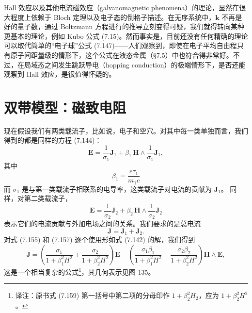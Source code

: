 Hall 效应以及其他电流磁效应（galvanomagnetic phenomena）的理论，显然在很大程度上依赖于 Bloch 定理以及电子态的倒格子描述。在无序系统中，$\mathbf{k}$ 不再是好的量子数，通过 Boltzmann 方程进行的推导立刻变得可疑，我们就得转向某种更基本的理论，例如 Kubo 公式 (7.15)。然而事实是，目前还没有任何精确的理论可以取代简单的“电子球”公式 (7.147)——人们观察到，即使在电子平均自由程只有原子间距量级的情形下，这个公式在液态金属（§7.5）中也符合得非常好。不过，在局域态之间发生跳跃导电（hopping conduction）的极端情形下，是否还能观察到 Hall 效应，是很值得怀疑的。

\section{双带模型：磁致电阻}

现在假设我们有两类载流子，比如说，电子和空穴。对其中每一类单独而言，我们得到的都是同样的方程 (7.144)：
\begin{equation*}
\mathbf{E}=\frac{1}{\sigma_{1}}\mathbf{J}_{1}+\beta_{1}\,\mathbf{H}\wedge\frac{1}{\sigma_{1}}\mathbf{J}_{1},\tag{7.155}
\end{equation*}
其中
\begin{equation*}
\beta_{1}=\frac{e\tau_{1}}{m_{1}c}\tag{7.156}
\end{equation*}
而 $\sigma_{1}$ 是与第一类载流子相联系的电导率，这类载流子对电流的贡献为 $\mathbf{J}_{1}$。
同样，对第二类载流子，
\begin{equation*}
\mathbf{E}=\frac{1}{\sigma_{2}}\mathbf{J}_{2}+\beta_{2}\,\mathbf{H}\wedge\frac{1}{\sigma_{2}}\mathbf{J}_{2}\tag{7.157}
\end{equation*}
表示它们的电流贡献与外加电场之间的关系。我们要求的是总电流
\begin{equation*}
\mathbf{J}=\mathbf{J}_{1}+\mathbf{J}_{2}.\tag{7.158}
\end{equation*}
对式 (7.155) 和 (7.157) 逐个使用形如式 (7.142) 的解，我们得到
\begin{equation*}
\mathbf{J}=\left(\frac{\sigma_{1}}{1+\beta_{1}^{2}H^{2}}+\frac{\sigma_{2}}{1+\beta_{2}^{2}H^{2}}\right)\mathbf{E}-\left(\frac{\sigma_{1}\beta_{1}}{1+\beta_{1}^{2}H^{2}}+\frac{\sigma_{2}\beta_{2}}{1+\beta_{2}^{2}H^{2}}\right)\mathbf{H}\wedge\mathbf{E},\tag{7.159}
\end{equation*}
这是一个相当复杂的公式\footnote{译注：原书式 (7.159) 第一括号中第二项的分母印作 $1+\beta_{2}^{2}H_{2}$，应为 $1+\beta_{2}^{2}H^{2}$。}，其几何表示见图 135。


